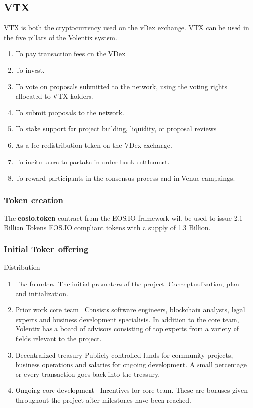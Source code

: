 \documentclass[]{article}
\begin{document}
\subsection{VTX}
VTX is both the cryptocurrency used on the vDex exchange. 
VTX can be used in the five pillars of the Volentix system.

\begin{enumerate}
\item To pay transaction fees on the VDex.
\item To invest. 
\item To vote on proposals submitted to the network, using the voting rights allocated to VTX holders.
\item To submit proposals to the network.
\item To stake support for project building, liquidity, or proposal reviews. 
\item As a fee redistribution token on the VDex exchange.
\item To incite users to partake in order book settlement.
\item To reward participants in the consensus process and in Venue campaings.
\end{enumerate}



\subsubsection{Token creation}
The \textbf{eosio.token} contract from the EOS.IO framework will be used to issue 2.1 Billion Tokens EOS.IO compliant tokens with a supply of 1.3 Billion.
 
 
\subsubsection{Initial Token offering}
 
Distribution
\begin{enumerate}
\item The founders\
The initial promoters of the project. 
Conceptualization, plan and initialization.	
\item Prior work core team \
Consists software engineers, blockchain analysts, legal experts and business development specialists. 
In addition to the core team, Volentix has a board of advisors consisting of top experts from a variety of fields relevant to the project.
\item Decentralized treasury
Publicly controlled funds for community projects, business operations and salaries for ongoing development. A small percentage or every transaction goes back into the treasury.
\item Ongoing core development \
Incentives for core team. These are bonuses given throughout the project after milestones have been reached.
\end{enumerate}
	
\end{document}
